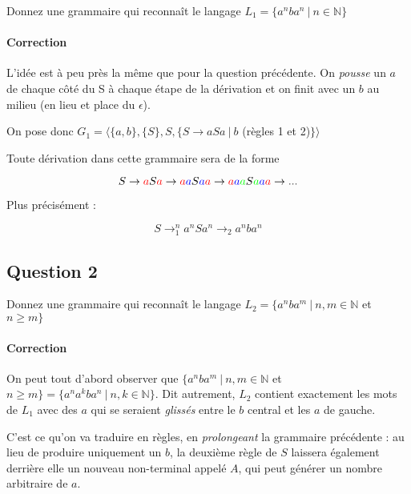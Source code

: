 \documentclass{article}[11pt]
\theoremstyle{definition}
\begin{document}
Donnez une grammaire qui reconnaît le langage $L_1 = \{a^nba^n~|~n \in \mathbb{N}\}$

\paragraph*{Correction} L'idée est à peu près la même que pour la question précédente. On \textit{pousse} un $a$ de chaque côté du S à chaque étape de la dérivation et on finit avec un $b$ au milieu (en lieu et place du $\epsilon$). \newline


\noindent
On pose donc $G_1 = \big \langle \{a,b\}, \{S\},S,\{S \rightarrow aSa~|~b $ (règles 1 et 2)$\}\big \rangle$ \newline

\noindent
Toute dérivation dans cette grammaire sera de la forme 

\[
S \rightarrow \textcolor{red}{a}S\textcolor{red}{a} \rightarrow \textcolor{red}{a}\textcolor{blue}{a}S\textcolor{blue}{a}\textcolor{red}{a} \rightarrow \textcolor{red}{a}\textcolor{blue}{a}\textcolor{green}{a}S\textcolor{green}{a}\textcolor{blue}{a}\textcolor{red}{a} \rightarrow ...
\]


\noindent
Plus précisément : 

\[
S \rightarrow_1^n a^nSa^n \rightarrow_2 a^nba^n 
\]

\subsection*{Question 2}

Donnez une grammaire qui reconnaît le langage $L_2 = \{a^nba^m~|~n,m \in \mathbb{N}$ et $ n \geq m\}$

\paragraph*{Correction} On peut tout d'abord observer que $\{a^nba^m~|~n,m \in \mathbb{N}$ et $ n \geq m\} = \{a^na^kba^n~|~n,k \in \mathbb{N} \}$. Dit autrement, $L_2$ contient exactement les mots de $L_1$ avec des $a$ qui se seraient \textit{glissés} entre le $b$ central et les $a$ de gauche.\newline

\noindent
C'est ce qu'on va traduire en règles, en \textit{prolongeant} la grammaire précédente : au lieu de produire uniquement un $b$, la deuxième règle de $S$ laissera également derrière elle un nouveau non-terminal appelé $A$, qui peut générer un nombre arbitraire de $a$.\newline
\end{document}
